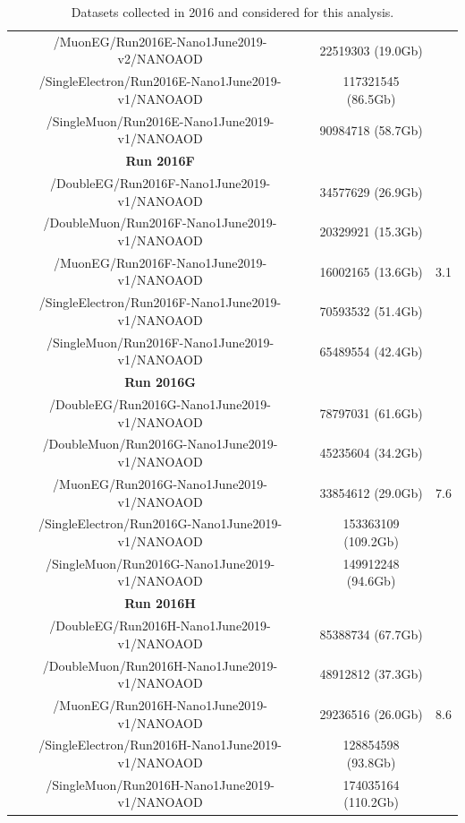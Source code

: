 \documentclass[a4paper, 10pt, openright]{report}
\begin{document}
\begin{appendices}
\begin{table}
\begin{center}
{\begin{tabular}{ c|c|c }
 /MuonEG/Run2016E-Nano1June2019-v2/NANOAOD & 22519303 (19.0Gb) & \\
 /SingleElectron/Run2016E-Nano1June2019-v1/NANOAOD & 117321545 (86.5Gb) & \\
 /SingleMuon/Run2016E-Nano1June2019-v1/NANOAOD & 90984718 (58.7Gb) & \\
 \hline
 \textbf{Run 2016F} & & \\
 /DoubleEG/Run2016F-Nano1June2019-v1/NANOAOD & 34577629 (26.9Gb) & \multirow{ 5}{*}{3.1} \\
 /DoubleMuon/Run2016F-Nano1June2019-v1/NANOAOD & 20329921 (15.3Gb) & \\
 /MuonEG/Run2016F-Nano1June2019-v1/NANOAOD & 16002165 (13.6Gb) & \\
 /SingleElectron/Run2016F-Nano1June2019-v1/NANOAOD & 70593532 (51.4Gb) & \\
 /SingleMuon/Run2016F-Nano1June2019-v1/NANOAOD & 65489554 (42.4Gb) & \\
 \hline
 \textbf{Run 2016G} & & \\
 /DoubleEG/Run2016G-Nano1June2019-v1/NANOAOD & 78797031 (61.6Gb) & \multirow{ 5}{*}{7.6} \\
 /DoubleMuon/Run2016G-Nano1June2019-v1/NANOAOD & 45235604 (34.2Gb) & \\
 /MuonEG/Run2016G-Nano1June2019-v1/NANOAOD & 33854612 (29.0Gb) & \\
 /SingleElectron/Run2016G-Nano1June2019-v1/NANOAOD & 153363109 (109.2Gb) & \\
 /SingleMuon/Run2016G-Nano1June2019-v1/NANOAOD & 149912248 (94.6Gb) & \\
 \hline
 \textbf{Run 2016H} & & \\
 /DoubleEG/Run2016H-Nano1June2019-v1/NANOAOD & 85388734 (67.7Gb) & \multirow{ 5}{*}{8.6} \\
 /DoubleMuon/Run2016H-Nano1June2019-v1/NANOAOD & 48912812 (37.3Gb) & \\
 /MuonEG/Run2016H-Nano1June2019-v1/NANOAOD & 29236516 (26.0Gb) & \\
 /SingleElectron/Run2016H-Nano1June2019-v1/NANOAOD & 128854598 (93.8Gb) & \\
 /SingleMuon/Run2016H-Nano1June2019-v1/NANOAOD & 174035164 (110.2Gb) & \\
 \hline
\end{tabular}
}
\caption{Datasets collected in 2016 and considered for this analysis.}
\label{table:Data2016}
\end{center}
\end{table}


\end{appendices}
\end{document}
